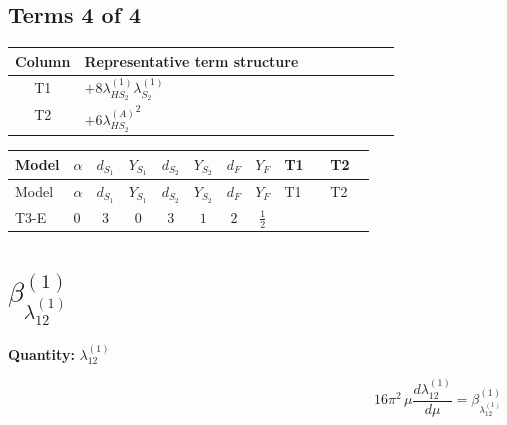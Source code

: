 \documentclass[8pt]{article}
\begin{document}
\begin{landscape}
\subsection*{Terms 4 of 4}
\begin{center}
\begin{tabular}{@{}c >{\raggedright\arraybackslash}p{0.82\linewidth}@{}}
\toprule
Column & Representative term structure \\
\midrule
T1 & \(\displaystyle +8 {\lambda_{HS_2}^{(1)}} {\lambda_{S_2}^{(1)}}\) \\
\midrule
T2 & \(\displaystyle +6 {\lambda_{HS_2}^{(A)}}^2\) \\
\midrule
\bottomrule
\end{tabular}
\end{center}
\smallskip
\tiny
\begin{longtable}{@{}llcccccc >{\raggedright\arraybackslash}p{0.21\linewidth} >{\raggedright\arraybackslash}p{0.21\linewidth}@{}}
\toprule
Model & $\alpha$ & $d_{S_1}$ & $Y_{S_1}$ & $d_{S_2}$ & $Y_{S_2}$ & $d_F$ & $Y_F$ & T1 & T2 \\
\midrule
\endfirsthead
\toprule
Model & $\alpha$ & $d_{S_1}$ & $Y_{S_1}$ & $d_{S_2}$ & $Y_{S_2}$ & $d_F$ & $Y_F$ & T1 & T2 \\
\midrule
\endhead
T3-E & $0$ & $3$ & $0$ & $3$ & $1$ & $2$ & $\frac{1}{2}$ & \scriptsize\adjustbox{max width=\linewidth}{$\begin{gathered} +8 {\lambda_{HS_2}^{(1)}} {\lambda_{S_2}^{(1)}}\end{gathered}$} & \scriptsize\adjustbox{max width=\linewidth}{$\begin{gathered} +6 {\lambda_{HS_2}^{(A)}}^2\end{gathered}$} \\
\midrule
\bottomrule
\end{longtable}
\clearpage
\section*{$\beta_{\lambda_{12}^{(1)}}^{(1)}$}
\noindent\textbf{Quantity: }$\lambda_{12}^{(1)}$\par\smallskip
\[16\pi^2\,\mu\frac{d \lambda_{12}^{(1)}}{d\mu}=\beta_{\lambda_{12}^{(1)}}^{(1)}\]

\end{landscape}
\end{document}
